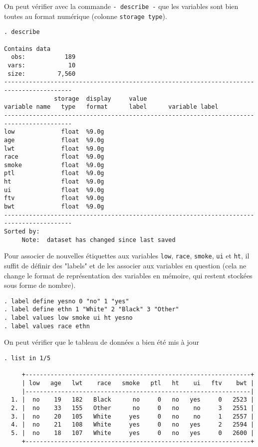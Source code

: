 On peut vérifier avec la commande \verb|- describe -| que les variables sont
bien toutes au format numérique (colonne \texttt{storage type}).
\begin{verbatim}
. describe

Contains data
  obs:           189                          
 vars:            10                          
 size:         7,560                          
-----------------------------------------------------------------------------------------
              storage  display     value
variable name   type   format      label      variable label
-----------------------------------------------------------------------------------------
low             float  %9.0g                  
age             float  %9.0g                  
lwt             float  %9.0g                  
race            float  %9.0g                  
smoke           float  %9.0g                  
ptl             float  %9.0g                  
ht              float  %9.0g                  
ui              float  %9.0g                  
ftv             float  %9.0g                  
bwt             float  %9.0g                  
-----------------------------------------------------------------------------------------
Sorted by:  
     Note:  dataset has changed since last saved
\end{verbatim}
Pour associer de nouvelles étiquettes aux variables \texttt{low},
\texttt{race}, \texttt{smoke}, \texttt{ui} et \texttt{ht}, il suffit de
définir des "labels" et de les associer aux variables en question (cela ne
change le format de représentation des variables en mémoire, qui restent
stockées sous forme de nombre).
\begin{verbatim}
. label define yesno 0 "no" 1 "yes"
. label define ethn 1 "White" 2 "Black" 3 "Other"
. label values low smoke ui ht yesno
. label values race ethn
\end{verbatim}
On peut vérifier que le tableau de données a bien été mis à jour
\begin{verbatim}
. list in 1/5

     +---------------------------------------------------------------+
     | low   age   lwt    race   smoke   ptl   ht    ui   ftv    bwt |
     |---------------------------------------------------------------|
  1. |  no    19   182   Black      no     0   no   yes     0   2523 |
  2. |  no    33   155   Other      no     0   no    no     3   2551 |
  3. |  no    20   105   White     yes     0   no    no     1   2557 |
  4. |  no    21   108   White     yes     0   no   yes     2   2594 |
  5. |  no    18   107   White     yes     0   no   yes     0   2600 |
     +---------------------------------------------------------------+
\end{verbatim}

